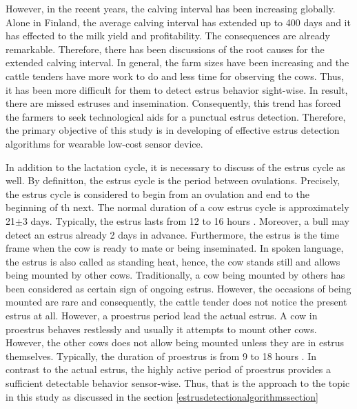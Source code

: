 \documentclass[english,12pt,a4paper,pdftex,elec,utf8]{aaltothesis}
\begin{document}
However, in the recent years, the calving interval has been increasing globally. Alone in Finland, the average calving interval has extended up to 400 days and it has effected to the milk yield and profitability. The consequences are already remarkable. Therefore, there has been discussions of the root causes for the extended calving interval. In general, the farm sizes have been increasing and the cattle tenders have more work to do and less time for observing the cows. Thus, it has been more difficult for them to detect estrus behavior sight-wise. In result, there are missed estruses and insemination. Consequently, this trend has forced the farmers to seek technological aids for a punctual estrus detection. Therefore, the primary objective of this study is in developing of effective estrus detection algorithms for wearable low-cost sensor device.

In addition to the lactation cycle, it is necessary to discuss of the estrus cycle as well. By definitton, the estrus cycle is the period between ovulations. Precisely, the estrus cycle is considered to begin from an ovulation and end to the beginning of th next. The normal duration of a cow estrus cycle is approximately 21$\pm$3 days. Typically, the estrus lasts from 12 to 16 hours \cite{julkaisuja52}. Moreover, a bull may detect an estrus already 2 days in advance. Furthermore, the estrus is the time frame when the cow is ready to mate or being inseminated. In spoken language, the estrus is also called as standing heat, hence, the cow stands still and allows being mounted by other cows. Traditionally, a cow being mounted by others has been considered as certain sign of ongoing estrus. However, the occasions of being mounted are rare and consequently, the cattle tender does not notice the present estrus at all. However, a proestrus period lead the actual estrus. A cow in proestrus behaves restlessly and usually it attempts to mount other cows. However, the other cows does not allow being mounted unless they are in estrus themselves. Typically, the duration of proestrus is from 9 to 18 hours \cite{lehmahavaintoja}. In contrast to the actual estrus, the highly active period of proestrus provides a sufficient detectable behavior sensor-wise. Thus, that is the approach to the topic in this study as discussed in the section \ref{estrusdetectionalgorithmssection}


\end{document}
